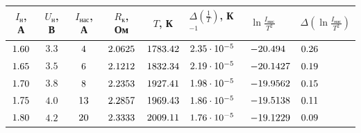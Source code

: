 \documentclass[12pt,a4paper]{article}
\newcommand{\CalcTwo}  [1]{\fpeval{round((#1),2)}}
\newcommand{\CalcFour} [1]{\fpeval{round((#1),4)}}
\def\IoneSeventyFive{\fpeval{4 * 10^(-3)}}
\def\ItwoSeventyFive{\fpeval{8 * 10^(-3)}}
\def\IthreeSeventyFive{\fpeval{20 * 10^(-3)}}
\def\IsatOne{\IoneSeventyFive}
\def\IsatTwo{\fpeval{6 * 10^(-3)}}
\def\IsatThree{\ItwoSeventyFive}
\def\IsatFour{\fpeval{13 * 10^(-3)}}
\def\IsatFive{\IthreeSeventyFive}
\def\InOne{\fpeval{1.60}}
\def\InTwo{\fpeval{1.65}}
\def\InThree{\fpeval{1.70}}
\def\InFour{\fpeval{1.75}}
\def\InFive{\fpeval{1.80}}
\def\UoneN  {3.3}
\def\UtwoN  {3.5}
\def\UthreeN{3.8}
\def\UfourN {4.0}
\def\UfiveN {4.2}
\begin{document}
\def\xMinOne{\fpeval{\TinvertedFive + \DeltaTinvertedFive}}
\def\yMinOne{\fpeval{\LnFive + \DeltaLnFive}}
\def\xMinTwo{\fpeval{\TinvertedOne - \DeltaTinvertedOne}}
\def\yMinTwo{\fpeval{\LnOne - \DeltaLnOne}}

\def\GammaMax{\fpeval{(\yMaxTwo - \yMaxOne) / (\xMaxTwo - \xMaxOne)}}
\def\GammaMin{\fpeval{(\yMinTwo - \yMinOne) / (\xMinTwo - \xMinOne)}}

\def\GammaMean{\fpeval{(\GammaMax + \GammaMin) / 2}}
\def\DeltaGamma{\fpeval{abs(\GammaMax - \GammaMin) / 2}}

\def\WorkFunction{\fpeval{-\GammaMean * ((1.38e-23) / (1.6e-19))}}
\def\DeltaWorkFunction{\fpeval{\DeltaGamma * ((1.38e-23) / (1.6e-19))}}

\begin{tabularx}{\textwidth}{|C|C|C|C|C|p{2cm}|p{2.5cm}|p{2cm}|}
	\hline
	$I_\text{н}$, А & $U_\text{н}$, В & $I_\text{нас}$, А & $R_\text{к}$, Ом & $T$, К & 
	$\Delta\left(\frac{1}{T}\right)$, К$^{-1}$ & \centering $\ln{\frac{I_\text{нас}}{T^2}}$ 
	& $\Delta\left(\ln{\frac{I_\text{нас}}{T^2}}\right)$ \\
	\hline
	$\InOne 0$ & $\UoneN$ & $\fpeval{\IsatOne * 1000}$ & $\CalcFour{\RkOne}$ & $\CalcTwo{\TOne}$ & $\CalcTwo{\DeltaTinvertedOne * 10^5} \cdot 10^{-5}$ & $\CalcFour{\LnOne}$ & $\CalcTwo{\DeltaLnOne}$ \\ 
	\hline
	$\InTwo$ & $\UtwoN$ & $\fpeval{\IsatTwo * 1000}$ & $\CalcFour{\RkTwo}$ & $\CalcTwo{\TTwo}$ & $\CalcTwo{\DeltaTinvertedTwo * 10^5} \cdot 10^{-5}$ & $\CalcFour{\LnTwo}$ & $\CalcTwo{\DeltaLnTwo}$ \\
	\hline
	$\InThree 0$ & $\UthreeN$ & $\fpeval{\IsatThree * 1000}$ & $\CalcFour{\RkThree}$ & $\CalcTwo{\TThree}$ & $\CalcTwo{\DeltaTinvertedThree * 10^5} \cdot 10^{-5}$ & $\CalcFour{\LnThree}$ & $\CalcTwo{\DeltaLnThree}$ \\
	\hline
	$\InFour$ & $\UfourN$ & $\fpeval{\IsatFour * 1000}$ & $\CalcFour{\RkFour}$ & $\CalcTwo{\TFour}$ & $\CalcTwo{\DeltaTinvertedFour * 10^5} \cdot 10^{-5}$ & $\CalcFour{\LnFour}$ & $\CalcTwo{\DeltaLnFour}$ \\
	\hline
	$\InFive 0$ & $\UfiveN$ & $\fpeval{\IsatFive * 1000}$ & $\CalcFour{\RkFive}$ & $\CalcTwo{\TFive}$ & $\CalcTwo{\DeltaTinvertedFive * 10^5} \cdot 10^{-5}$ & $\CalcFour{\LnFive}$ & $\CalcTwo{\DeltaLnFive}$ \\
	\hline
\end{tabularx}

\vspace{1em}
\end{document}
